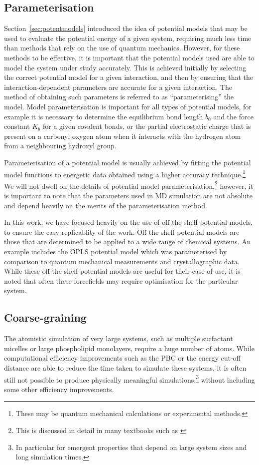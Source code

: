 \subsection{Parameterisation}
\label{sec:parameterisation}
Section~\ref{sec:potentmodels} introduced the idea of potential models that may be used to evaluate the potential energy of a given system, requiring much less time than methods that rely on the use of quantum mechanics.
However, for these methods to be effective, it is important that the potential models used are able to model the system under study accurately.
This is achieved initially by selecting the correct potential model for a given interaction, and then by ensuring that the interaction-dependent parameters are accurate for a given interaction.
The method of obtaining such parameters is referred to as ``parameterising'' the model.
Model parameterisation is important for all types of potential models, for example it is necessary to determine the equilibrium bond length $b_0$ and the force constant $K_b$ for a given covalent bonds, or the partial electrostatic charge that is present on a carbonyl oxygen atom when it interacts with the hydrogen atom from a neighbouring hydroxyl group.

Parameterisation of a potential model is usually achieved by fitting the potential model functions to energetic data obtained using a higher accuracy technique.\footnote{These may be quantum mechanical calculations or experimental methods.}
We will not dwell on the details of potential model parameterisation,\footnote{This is discussed in detail in many textbooks such as \cite{harvey_computational_2018,leach_molecular_1996}} however, it is important to note that the parameters used in MD simulation are not absolute and depend heavily on the merits of the parameterisation method.

In this work, we have focused heavily on the use of off-the-shelf potential models, to ensure the easy replicablity of the work.
Off-the-shelf potential models are those that are determined to be applied to a wide range of chemical systems.
An example includes the OPLS potential model which was parameterised by comparison to quantum mechanical measurements and crystallographic data.\autocite{jorgensen_opls_1988}
While these off-the-shelf potential models are useful for their ease-of-use, it is noted that often these forcefields may require optimisation for the particular system.

\subsection{Coarse-graining}
\label{sec:coarsegraining}
The atomistic simulation of very large systems, such as multiple surfactant micelles or large phospholipid monolayers, require a huge number of atoms.
While computational efficiency improvements such as the PBC or the energy cut-off distance are able to reduce the time taken to simulate these systems, it is often still not possible to produce physically meaningful simulations,\footnote{In particular for emergent properties that depend on large system sizes and long simulation times.} without including some other efficiency improvements.

